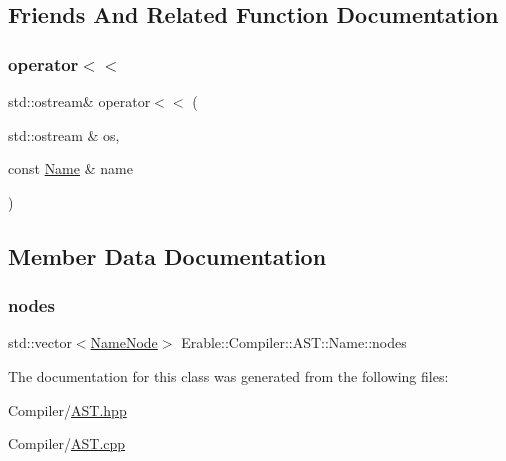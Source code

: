 \subsection{Friends And Related Function Documentation}
\mbox{\label{class_erable_1_1_compiler_1_1_a_s_t_1_1_name_a6aacec03a456bb828ba18f86f151078f}} 
\subsubsection{\texorpdfstring{operator$<$$<$}{operator<<}}
{\footnotesize\ttfamily std\+::ostream\& operator$<$$<$ (\begin{DoxyParamCaption}\item[{std\+::ostream \&}]{os,  }\item[{const \mbox{\hyperlink{class_erable_1_1_compiler_1_1_a_s_t_1_1_name}{Name}} \&}]{name }\end{DoxyParamCaption})\hspace{0.3cm}{\ttfamily [friend]}}



\subsection{Member Data Documentation}
\mbox{\label{class_erable_1_1_compiler_1_1_a_s_t_1_1_name_ad0f349d658f7d1300785b37fac094305}} 
\subsubsection{\texorpdfstring{nodes}{nodes}}
{\footnotesize\ttfamily std\+::vector$<$\mbox{\hyperlink{struct_erable_1_1_compiler_1_1_a_s_t_1_1_name_node}{Name\+Node}}$>$ Erable\+::\+Compiler\+::\+A\+S\+T\+::\+Name\+::nodes\hspace{0.3cm}{\ttfamily [private]}}



The documentation for this class was generated from the following files\+:\begin{DoxyCompactItemize}
\item 
Compiler/\mbox{\hyperlink{_a_s_t_8hpp}{A\+S\+T.\+hpp}}\item 
Compiler/\mbox{\hyperlink{_a_s_t_8cpp}{A\+S\+T.\+cpp}}\end{DoxyCompactItemize}
